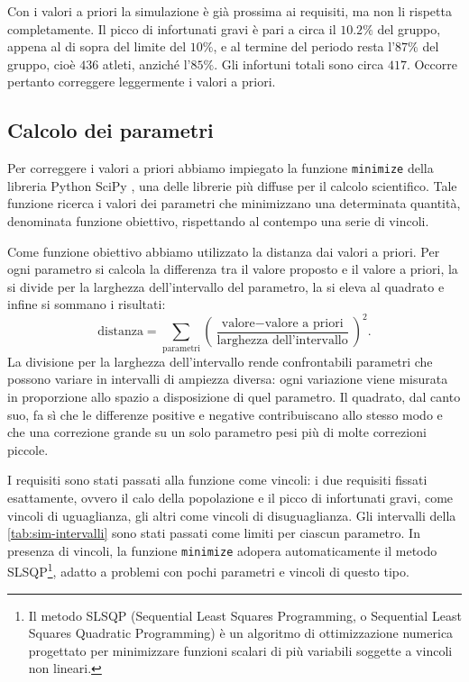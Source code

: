 Con i valori a priori la simulazione è già prossima ai requisiti, ma non li rispetta completamente. Il picco di infortunati gravi è pari a circa il $10.2\%$ del gruppo, appena al di sopra del limite del $10\%$, e al termine del periodo resta l'$87\%$ del gruppo, cioè $436$ atleti, anziché l'$85\%$. Gli infortuni totali sono circa $417$. Occorre pertanto correggere leggermente i valori a priori.

\subsection{Calcolo dei parametri}

Per correggere i valori a priori abbiamo impiegato la funzione \texttt{minimize} della libreria Python SciPy \cite{virtanen2020}, una delle librerie più diffuse per il calcolo scientifico. Tale funzione ricerca i valori dei parametri che minimizzano una determinata quantità, denominata funzione obiettivo, rispettando al contempo una serie di vincoli. \par

Come funzione obiettivo abbiamo utilizzato la distanza dai valori a priori. Per ogni parametro si calcola la differenza tra il valore proposto e il valore a priori, la si divide per la larghezza dell'intervallo del parametro, la si eleva al quadrato e infine si sommano i risultati:
\[
    \text{distanza} = \sum_{\text{parametri}} \left(\frac{\text{valore} - \text{valore a priori}}{\text{larghezza dell'intervallo}}\right)^2.
\]
La divisione per la larghezza dell'intervallo rende confrontabili parametri che possono variare in intervalli di ampiezza diversa: ogni variazione viene misurata in proporzione allo spazio a disposizione di quel parametro. Il quadrato, dal canto suo, fa sì che le differenze positive e negative contribuiscano allo stesso modo e che una correzione grande su un solo parametro pesi più di molte correzioni piccole. \par

I requisiti sono stati passati alla funzione come vincoli: i due requisiti fissati esattamente, ovvero il calo della popolazione e il picco di infortunati gravi, come vincoli di uguaglianza, gli altri come vincoli di disuguaglianza. Gli intervalli della \autoref{tab:sim-intervalli} sono stati passati come limiti per ciascun parametro. In presenza di vincoli, la funzione \texttt{minimize} adopera automaticamente il metodo SLSQP\footnote{Il metodo SLSQP (Sequential Least Squares Programming, o Sequential Least Squares Quadratic Programming) è un algoritmo di ottimizzazione numerica progettato per minimizzare funzioni scalari di più variabili soggette a vincoli non lineari.}, adatto a problemi con pochi parametri e vincoli di questo tipo. \par

